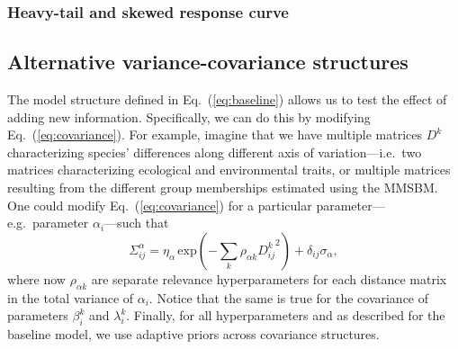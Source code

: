 \documentclass[11pt, a4paper]{article}
\begin{document}
\subsubsection*{Heavy-tail and skewed response curve}

\subsection*{Alternative variance-covariance structures}
The model structure defined in Eq.~(\ref{eq:baseline}) allows us to test the effect of adding new information. Specifically, we can do this by modifying Eq.~(\ref{eq:covariance}). For example, imagine that we have multiple matrices $D^k$ characterizing species' differences along different axis of variation---i.e.~two matrices characterizing ecological and environmental traits, or multiple matrices resulting from the different group memberships estimated using the MMSBM. One could modify Eq.~(\ref{eq:covariance}) for a particular parameter---e.g.~parameter $\alpha_i$---such that
\begin{equation} 
\Sigma^{\alpha}_{ij} = \eta_{\alpha}\,\text{exp}\left(-\sum_k\rho_{\alpha k} {D^{k}_{ij}}^2\right) + \delta_{ij} \sigma_{\alpha} ,
\label{eq:covariance-complex}
\end{equation}
where now $\rho_{\alpha k}$ are separate relevance hyperparameters for each distance matrix in the total variance of $\alpha_i$. Notice that the same is true for the covariance of parameters $\beta_i^k$ and $\lambda_i^k$. Finally, for all hyperparameters and as described for the baseline model, we use adaptive priors across covariance structures.
\end{document}
